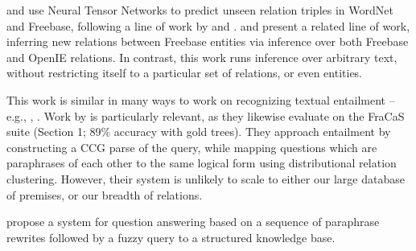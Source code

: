  and 
  use Neural Tensor Networks to predict unseen relation triples in
  WordNet and Freebase, following a line of work by
   and
  .
 and 
  present a related line of work, inferring new relations between
  Freebase entities via inference over both Freebase and
  OpenIE relations.
In contrast, this work runs inference over arbitrary text, without 
  restricting itself to a particular set of relations, or even entities.

This work is similar in many ways to work on 
  recognizing textual entailment -- e.g., 
  , .
Work by  is particularly relevant,
  as they likewise evaluate on the FraCaS suite (Section 1;
  89\% accuracy with gold trees).
They approach entailment by constructing a CCG parse of the query,
  while mapping questions which are paraphrases of each other to the
  same logical form using distributional relation clustering.
However, their system is unlikely to scale to either our large
  database of premises, or our breadth of relations.

 propose a system for question answering
  based on a sequence of paraphrase rewrites followed by a fuzzy query to
  a structured knowledge base.



